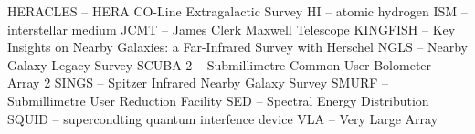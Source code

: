 HERACLES -- HERA CO-Line Extragalactic Survey
HI -- atomic hydrogen
ISM -- interstellar medium
JCMT -- James Clerk Maxwell Telescope
KINGFISH -- Key Insights on Nearby Galaxies: a Far-Infrared Survey with Herschel
NGLS -- Nearby Galaxy Legacy Survey
SCUBA-2 -- Submillimetre Common-User Bolometer Array 2
SINGS -- Spitzer Infrared Nearby Galaxy Survey
SMURF -- Submillimetre User Reduction Facility
SED -- Spectral Energy Distribution
SQUID -- supercondting quantum interfence device
VLA -- Very Large Array
